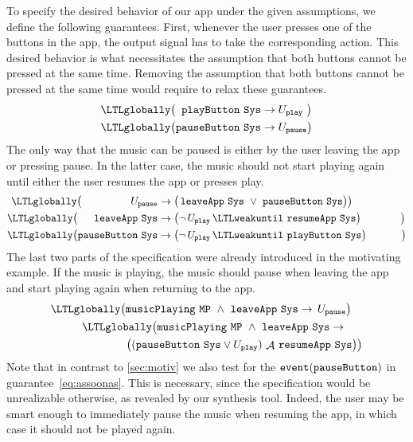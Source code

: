 To specify the desired behavior of our app under the given assumptions, we define the following \TSL guarantees.
First, whenever the user presses one of the buttons in the app, the output signal has to take the corresponding action.
This desired behavior is what necessitates the assumption that both buttons cannot be pressed at the same time.
Removing the assumption that both buttons cannot be pressed at the same time would require to relax these guarantees.
%
\setcounter{equation}{0}
\renewcommand{\theequation}{G\arabic{equation}}
%
\begin{align}
  \LTLglobally \big( \phantom{a} \name{playButton}~\name{Sys} & \to U_{\name{play}} \hspace{3.4pt} \big)  \\
  \LTLglobally \big( \name{pauseButton}~\name{Sys} & \to U_{\name{pause}} \big)
\end{align}
%
The only way that the music can be paused is either by the user leaving the app or pressing pause.
In the latter case, the music should not start playing again until either the user resumes the app or presses play.
%
\begin{align}
  \LTLglobally \big(  \hspace{47.02pt}  U_{\name{pause}} &\to \big(\, \name{leaveApp}~\name{Sys} \ \lor \ \name{pauseButton}~\name{Sys} \big)\big) \\
  \LTLglobally \big( \phantom{\name{ton}}\name{leaveApp}~\name{Sys}  & \to \big(\neg \, U_{\name{play}} \, \LTLweakuntil \ \name{resumeApp}~\name{Sys}\big) \hspace{38pt} \big)\\
   \LTLglobally \big( \name{pauseButton}~\name{Sys}                   & \to \big(\neg \, U_{\name{play}} \, \LTLweakuntil \ \name{playButton}~\name{Sys} \big) \hspace{33.6pt} \big)
\end{align}
%
The last two parts of the specification were already introduced in the motivating example.
If the music is playing, the music should pause when leaving the app and start playing again when returning to the app.
\begin{align}
  \begin{split}
    & \LTLglobally \big( \name{musicPlaying}~\name{MP} \ \wedge \ \name{leaveApp}~\name{Sys} \to \, U_{\name{pause}} \big)
  \end{split} \\
  \begin{split} \label{eq:assoonas}
    &\LTLglobally \big( \name{musicPlaying}~\name{MP} \ \wedge \ \name{leaveApp}~\name{Sys} \to  \\
     & \qquad \qquad \big((\name{pauseButton}~\name{Sys} \lor U_{\name{play}})\, \mathop{\mathcal{A}}\, \name{resumeApp}~\name{Sys} \big) \big)
  \end{split}
\end{align}
%
Note that in contrast to \cref{sec:motiv} we also test for the $ {\text{\texttt{event}}}({\text{\texttt{pauseButton}}}) $ in guarantee~\cref{eq:assoonas}. This is necessary, since the specification would be unrealizable otherwise, as revealed by our synthesis tool. Indeed, the user may be smart enough to immediately pause the music when resuming the app, in which case it should not be played again.

